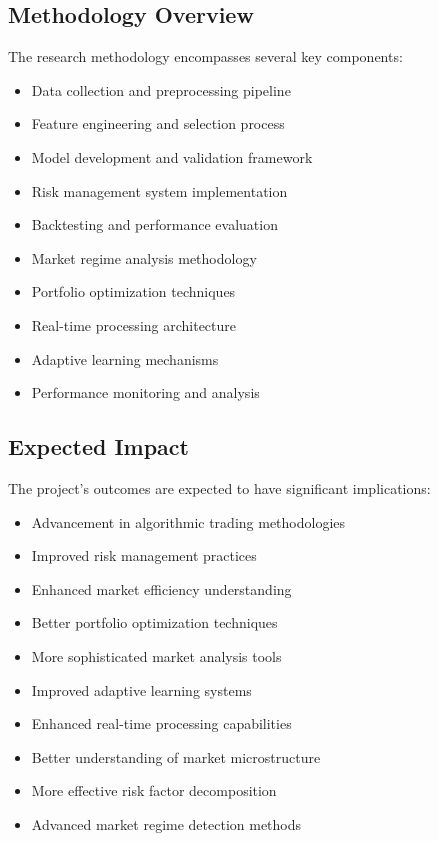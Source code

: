 \documentclass[conference]{IEEEtran}
\begin{document}
\subsection{Methodology Overview}
The research methodology encompasses several key components:
\begin{itemize}
    \item Data collection and preprocessing pipeline
    \item Feature engineering and selection process
    \item Model development and validation framework
    \item Risk management system implementation
    \item Backtesting and performance evaluation
    \item Market regime analysis methodology
    \item Portfolio optimization techniques
    \item Real-time processing architecture
    \item Adaptive learning mechanisms
    \item Performance monitoring and analysis
\end{itemize}

\subsection{Expected Impact}
The project's outcomes are expected to have significant implications:
\begin{itemize}
    \item Advancement in algorithmic trading methodologies
    \item Improved risk management practices
    \item Enhanced market efficiency understanding
    \item Better portfolio optimization techniques
    \item More sophisticated market analysis tools
    \item Improved adaptive learning systems
    \item Enhanced real-time processing capabilities
    \item Better understanding of market microstructure
    \item More effective risk factor decomposition
    \item Advanced market regime detection methods
\end{itemize}
\end{document}
